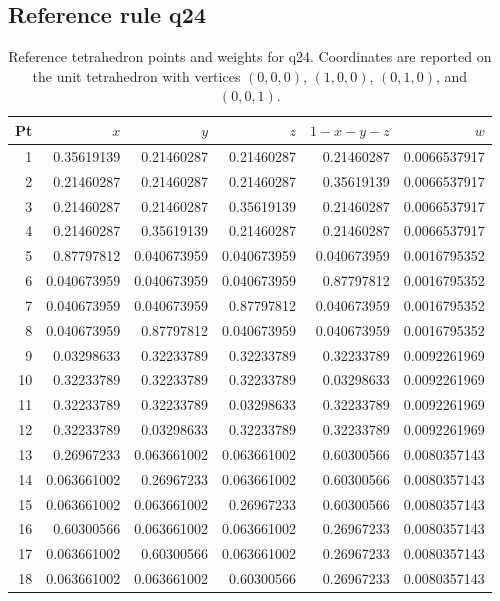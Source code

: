 \subsection*{Reference rule q24}
\scriptsize
\begin{table}[H]
\centering
\caption{Reference tetrahedron points and weights for q24. Coordinates are reported on the unit tetrahedron with vertices $(0,0,0)$, $(1,0,0)$, $(0,1,0)$, and $(0,0,1)$.}
\begin{tabular}{@{}rrrrrr@{}}
\toprule
Pt & $x$ & $y$ & $z$ & $1-x-y-z$ & $w$ \\
\midrule
1 & 0.35619139 & 0.21460287 & 0.21460287 & 0.21460287 & 0.0066537917 \\
2 & 0.21460287 & 0.21460287 & 0.21460287 & 0.35619139 & 0.0066537917 \\
3 & 0.21460287 & 0.21460287 & 0.35619139 & 0.21460287 & 0.0066537917 \\
4 & 0.21460287 & 0.35619139 & 0.21460287 & 0.21460287 & 0.0066537917 \\
5 & 0.87797812 & 0.040673959 & 0.040673959 & 0.040673959 & 0.0016795352 \\
6 & 0.040673959 & 0.040673959 & 0.040673959 & 0.87797812 & 0.0016795352 \\
7 & 0.040673959 & 0.040673959 & 0.87797812 & 0.040673959 & 0.0016795352 \\
8 & 0.040673959 & 0.87797812 & 0.040673959 & 0.040673959 & 0.0016795352 \\
9 & 0.03298633 & 0.32233789 & 0.32233789 & 0.32233789 & 0.0092261969 \\
10 & 0.32233789 & 0.32233789 & 0.32233789 & 0.03298633 & 0.0092261969 \\
11 & 0.32233789 & 0.32233789 & 0.03298633 & 0.32233789 & 0.0092261969 \\
12 & 0.32233789 & 0.03298633 & 0.32233789 & 0.32233789 & 0.0092261969 \\
13 & 0.26967233 & 0.063661002 & 0.063661002 & 0.60300566 & 0.0080357143 \\
14 & 0.063661002 & 0.26967233 & 0.063661002 & 0.60300566 & 0.0080357143 \\
15 & 0.063661002 & 0.063661002 & 0.26967233 & 0.60300566 & 0.0080357143 \\
16 & 0.60300566 & 0.063661002 & 0.063661002 & 0.26967233 & 0.0080357143 \\
17 & 0.063661002 & 0.60300566 & 0.063661002 & 0.26967233 & 0.0080357143 \\
18 & 0.063661002 & 0.063661002 & 0.60300566 & 0.26967233 & 0.0080357143 \\

\end{tabular}
\end{table}
